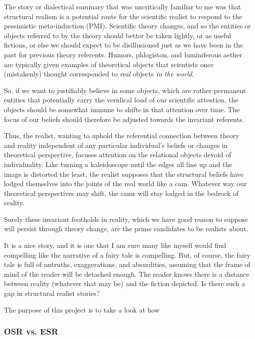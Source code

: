 The story or dialectical summary that was uncritically familiar to me was that structural realism is a potential route for the scientific realist to respond to the pessimistic meta-induction (PMI).  Scientific theory changes, and so the entities or objects referred to by the theory should better be taken lightly, or as useful fictions, or else we should expect to be disillusioned just as we have been in the past for previous theory referents.  Humors, phlogiston, and luminiferous aether are typically given examples of theoretical objects that scientists once (mistakenly) thought corresponded to \emph{real} objects \emph{in the world}.

So, if we want to justifiably believe in some objects, which are rather permanent entities that potentially carry the veridical load of our scientific attention, the objects should be somewhat immune to shifts in that attention over time.  The focus of our beliefs should therefore be adjusted towards the invariant referents.

Thus, the realist, wanting to uphold the referential connection between theory and reality independent of any particular individual's beliefs or changes in theoretical perspective, focuses attention on the relational objects devoid of individuality.  Like turning a kaleidoscope until the edges all line up and the image is distorted the least, the realist supposes that the structural beliefs have lodged themselves into the joints of the real world like a cam.  Whatever way our theoretical perspectives may shift, the cams will stay lodged in the bedrock of reality.

Surely these invariant footholds in reality, which we have good reason to suppose will persist through theory change, are the prime candidates to be realists about.

It is a nice story, and it is one that I am sure many like myself would find compelling like the narrative of a fairy tale is compelling.  But, of course, the fairy tale is full of untruths, exaggerations, and absurdities, assuming that the frame of mind of the reader will be detached enough.  The reader knows there is a distance between reality (whatever that may be) and the fiction depicted.  Is there such a gap in structural realist stories?

The purpose of this project is to take a look at how 

\subsubsection{OSR vs. ESR}

